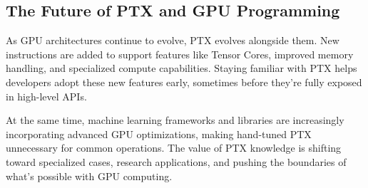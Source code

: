 \subsection{The Future of PTX and GPU Programming}

As GPU architectures continue to evolve, PTX evolves alongside them. New instructions are added to support features like Tensor Cores, improved memory handling, and specialized compute capabilities. Staying familiar with PTX helps developers adopt these new features early, sometimes before they're fully exposed in high-level APIs.

At the same time, machine learning frameworks and libraries are increasingly incorporating advanced GPU optimizations, making hand-tuned PTX unnecessary for common operations. The value of PTX knowledge is shifting toward specialized cases, research applications, and pushing the boundaries of what's possible with GPU computing.

